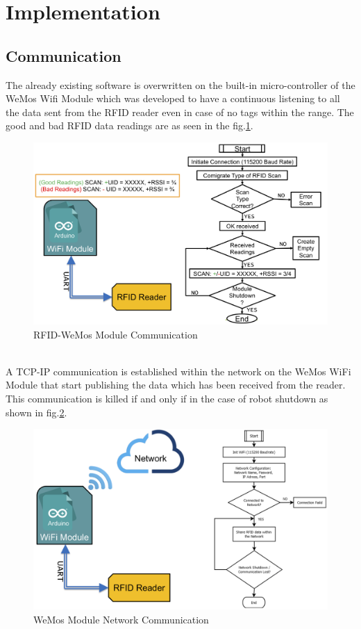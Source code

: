 \section{Implementation}\label{Sec_Imp}

\subsection{Communication}
The already existing software is overwritten on the  built-in micro-controller of the WeMos Wifi Module which was developed to have a continuous listening to all the data  sent from the RFID reader even in case of no tags within the range. The good and bad RFID data readings are as seen in the fig.\ref{rfid_wifi}.\\
\begin{figure}[!htbp]
	\centering
	\includegraphics[width = 14cm]{Pictures/rfidwifi}
	\caption{RFID-WeMos Module Communication}
	\label{rfid_wifi}
\end{figure}\\
A TCP-IP communication is established within the network on the WeMos WiFi Module that start publishing the data which has been received from the reader. This communication is killed if and only if in the case of robot shutdown as shown in fig.\ref{wifi_network}.\\
\begin{figure}[!htbp]
	\centering
	\includegraphics[width = 14cm]{Pictures/wifinetwork}
	\caption{WeMos Module Network Communication}
	\label{wifi_network}
\end{figure}
